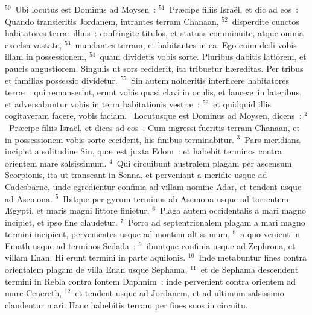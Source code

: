 ${}^{50}$~Ubi locutus est Dominus ad Moysen~:
${}^{51}$~Pr\ae cipe filiis Isra\"el, et dic ad eos~: Quando transieritis Jordanem, intrantes terram Chanaan,
${}^{52}$~disperdite cunctos habitatores terr\ae\ illius~: confringite titulos, et statuas comminuite, atque omnia excelsa vastate,
${}^{53}$~mundantes terram, et habitantes in ea. Ego enim dedi vobis illam in possessionem,
${}^{54}$~quam dividetis vobis sorte. Pluribus dabitis latiorem, et paucis angustiorem. Singulis ut sors ceciderit, ita tribuetur h\ae reditas. Per tribus et familias possessio dividetur.
${}^{55}$~Sin autem nolueritis interficere habitatores terr\ae~: qui remanserint, erunt vobis quasi clavi in oculis, et lance\ae\ in lateribus, et adversabuntur vobis in terra habitationis vestr\ae~:
${}^{56}$~et quidquid illis cogitaveram facere, vobis faciam.
~Locutusque est Dominus ad Moysen, dicens~:
${}^{2}$~Pr\ae cipe filiis Isra\"el, et dices ad eos~: Cum ingressi fueritis terram Chanaan, et in possessionem vobis sorte ceciderit, his finibus terminabitur.
${}^{3}$~Pars meridiana incipiet a solitudine Sin, qu\ae\ est juxta Edom~: et habebit terminos contra orientem mare salsissimum.
${}^{4}$~Qui circuibunt australem plagam per ascensum Scorpionis, ita ut transeant in Senna, et perveniant a meridie usque ad Cadesbarne, unde egredientur confinia ad villam nomine Adar, et tendent usque ad Asemona.
${}^{5}$~Ibitque per gyrum terminus ab Asemona usque ad torrentem \AE gypti, et maris magni littore finietur.
${}^{6}$~Plaga autem occidentalis a mari magno incipiet, et ipso fine claudetur.
${}^{7}$~Porro ad septentrionalem plagam a mari magno termini incipient, pervenientes usque ad montem altissimum,
${}^{8}$~a quo venient in Emath usque ad terminos Sedada~:
${}^{9}$~ibuntque confinia usque ad Zephrona, et villam Enan. Hi erunt termini in parte aquilonis.
${}^{10}$~Inde metabuntur fines contra orientalem plagam de villa Enan usque Sephama,
${}^{11}$~et de Sephama descendent termini in Rebla contra fontem Daphnim~: inde pervenient contra orientem ad mare Cenereth,
${}^{12}$~et tendent usque ad Jordanem, et ad ultimum salsissimo claudentur mari. Hanc habebitis terram per fines suos in circuitu.


